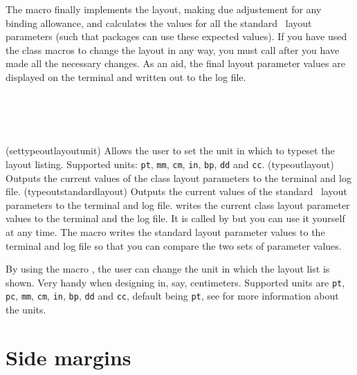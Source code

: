     The \cmd{\fixthelayout} macro finally implements the layout,
making due adjustement for any binding allowance,
and calculates the values for all the standard \ltx\ layout 
parameters (such
that packages can use these expected values).
If you have used the class macros to change
the layout in any way, you must call \cmd{\checkandfixthelayout} after you have
made all the necessary changes. As an aid, the final layout parameter values
are displayed on the terminal and written out to the log file.

\begin{syntax}
\cmd{\typeoutlayout} \\
\cmd{\typeoutstandardlayout} \\
\cmd{\settypeoutlayoutunit} \\
\end{syntax}
\glossary(settypeoutlayoutunit)%
  {}%
  {Allows the user to set the unit in which to typeset the layout
    listing. Supported units: \texttt{pt}, \texttt{mm}, \texttt{cm},
    \texttt{in}, \texttt{bp}, \texttt{dd} and \texttt{cc}.}
\glossary(typeoutlayout)%
  {}%
  {Outputs the current values of the class layout parameters to the 
   terminal and log file.}
\glossary(typeoutstandardlayout)%
  {}%
  {Outputs the current values of the standard \ltx\ layout parameters 
   to the terminal and log file.}
 \cmd{\typeoutlayout} writes the current class layout
parameter values to the terminal 
and the log file. It is called by \cmd{\checkandfixthelayout} but you can 
use it yourself at any time.
The macro \cmd{\typeoutstandardlayout} writes the
standard layout parameter
 values to the terminal and log file so that you can
compare the two sets of parameter values.

By using the macro \cmd{\settypeoutlayoutunit}, the user can change
the unit in which the layout list is shown. Very handy when designing
in, say, centimeters. Supported units are \texttt{pt}, \texttt{pc},
\texttt{mm}, \texttt{cm}, \texttt{in}, \texttt{bp}, \texttt{dd} and
\texttt{cc}, default being \texttt{pt}, see  for more
information about the units.

\section{Side margins}

